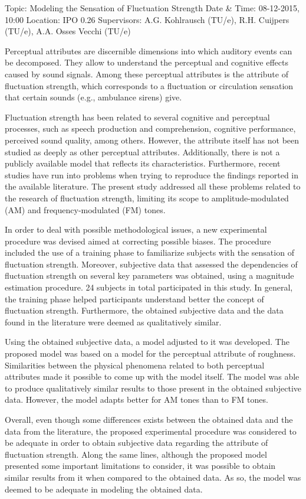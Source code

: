 Topic: Modeling the Sensation of Fluctuation Strength
Date & Time: 08-12-2015, 10:00
Location: IPO 0.26
Supervisors: A.G. Kohlrausch (TU/e), R.H. Cuijpers (TU/e), A.A. Osses Vecchi (TU/e)

Perceptual attributes are discernible dimensions into which auditory events can
be decomposed. They allow to understand the perceptual and cognitive effects
caused by sound signals. Among these perceptual attributes is the attribute of
fluctuation strength, which corresponds to a fluctuation or circulation
sensation that certain sounds (e.g., ambulance sirens) give.

Fluctuation strength has been related to several cognitive and perceptual
processes, such as speech production and comprehension, cognitive performance,
perceived sound quality, among others. However, the attribute itself has not
been studied as deeply as other perceptual attributes. Additionally, there is
not a publicly available model that reflects its characteristics. Furthermore,
recent studies have run into problems when trying to reproduce the findings
reported in the available literature. The present study addressed all these
problems related to the research of fluctuation strength, limiting its scope
to amplitude-modulated (AM) and frequency-modulated (FM) tones.

In order to deal with possible methodological issues, a new experimental
procedure was devised aimed at correcting possible biases. The procedure
included the use of a training phase to familiarize subjects with the sensation
of fluctuation strength. Moreover, subjective data that assessed the
dependencies of fluctuation strength on several key parameters was obtained,
using a magnitude estimation procedure. 24 subjects in total participated in
this study. In general, the training phase helped participants understand better
the concept of fluctuation strength. Furthermore, the obtained subjective data
and the data found in the literature were deemed as qualitatively similar.

Using the obtained subjective data, a model adjusted to it was developed. The
proposed model was based on a model for the perceptual attribute of
roughness. Similarities between the physical phenomena related to both
perceptual attributes made it possible to come up with the model itself.
The model was able to produce qualitatively similar results to those present
in the obtained subjective data. However, the model adapts better for AM tones
than to FM tones.

Overall, even though some differences exists between the obtained data and the
data from the literature, the proposed experimental procedure was considered
to be adequate in order to obtain subjective data regarding the attribute of
fluctuation strength. Along the same lines, although the proposed model
presented some important limitations to consider, it was possible to obtain
similar results from it when compared to the obtained data. As so, the model
was deemed to be adequate in modeling the obtained data.
